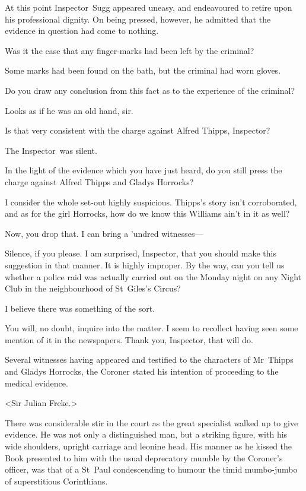At this point Inspector~Sugg appeared uneasy, and endeavoured to retire upon his professional dignity. On being pressed, however, he admitted that the evidence in question had come to nothing.

\begin{dialogue}
 Was it the case that any finger-marks had been left by the criminal?

Some marks had been found on the bath, but the criminal had worn gloves.

 Do you draw any conclusion from this fact as to the experience of the criminal?

 Looks as if he was an old hand, sir.

 Is that very consistent with the charge against Alfred Thipps, Inspector?

The Inspector~was silent.

 In the light of the evidence which you have just heard, do you still press the charge against Alfred Thipps and Gladys Horrocks?

 I consider the whole set-out highly suspicious. Thipps's story isn't corroborated, and as for the girl Horrocks, how do we know this Williams ain't in it as well?

 Now, you drop that. I can bring a 'undred witnesses—

 Silence, if you please. I am surprised, Inspector, that you should make this suggestion in that manner. It is highly improper. By the way, can you tell us whether a police raid was actually carried out on the Monday night on any Night Club in the neighbourhood of St~Giles's Circus?

  I believe there was something of the sort.

 You will, no doubt, inquire into the matter. I seem to recollect having seen some mention of it in the newspapers. Thank you, Inspector, that will do.
\end{dialogue}

Several witnesses having appeared and testified to the characters of Mr~Thipps and Gladys Horrocks, the Coroner stated his intention of proceeding to the medical evidence.

<Sir Julian Freke.>

There was considerable stir in the court as the great specialist walked up to give evidence. He was not only a distinguished man, but a striking figure, with his wide shoulders, upright carriage and leonine head. His manner as he kissed the Book presented to him with the usual deprecatory mumble by the Coroner's officer, was that of a St~Paul condescending to humour the timid mumbo-jumbo of superstitious Corinthians.

